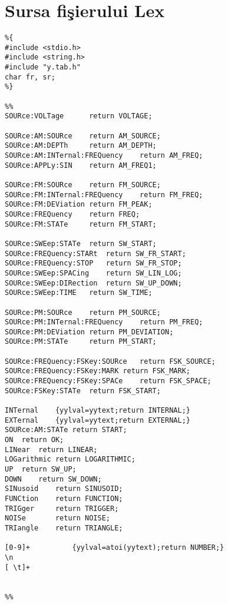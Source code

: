 
\chapter{Sursa fi\c{s}ierului Lex}
\label{AnexaA}

\begin{lstlisting}
%{
#include <stdio.h>
#include <string.h>
#include "y.tab.h"
char fr, sr;
%}

%%
SOURce:VOLTage		return VOLTAGE;

SOURce:AM:SOURce	return AM_SOURCE;
SOURce:AM:DEPTh		return AM_DEPTH;
SOURce:AM:INTernal:FREQuency	return AM_FREQ;
SOURce:APPLy:SIN	return AM_FREQ1;

SOURce:FM:SOURce	return FM_SOURCE;
SOURce:FM:INTernal:FREQuency	return FM_FREQ;
SOURce:FM:DEViation	return FM_PEAK;
SOURce:FREQuency	return FREQ;
SOURce:FM:STATe		return FM_START;

SOURce:SWEep:STATe	return SW_START;
SOURce:FREQuency:STARt	return SW_FR_START;
SOURce:FREQuency:STOP	return SW_FR_STOP;
SOURce:SWEep:SPACing	return SW_LIN_LOG;
SOURce:SWEep:DIRection	return SW_UP_DOWN;
SOURce:SWEep:TIME	return SW_TIME;

SOURce:PM:SOURce	return PM_SOURCE;
SOURce:PM:INTernal:FREQuency	return PM_FREQ;
SOURce:PM:DEViation	return PM_DEVIATION;
SOURce:PM:STATe		return PM_START;

SOURce:FREQuency:FSKey:SOURce	return FSK_SOURCE;
SOURce:FREQuency:FSKey:MARK	return FSK_MARK;
SOURce:FREQuency:FSKey:SPACe	return FSK_SPACE;
SOURce:FSKey:STATe	return FSK_START;

INTernal	{yylval=yytext;return INTERNAL;}
EXTernal	{yylval=yytext;return EXTERNAL;}
SOURce:AM:STATe	return START;
ON	return OK;
LINear	return LINEAR;
LOGarithmic	return LOGARITHMIC;
UP	return SW_UP;
DOWN	return SW_DOWN;
SINusoid	return SINUSOID;
FUNCtion	return FUNCTION;
TRIGger		return TRIGGER;
NOISe		return NOISE;
TRIangle	return TRIANGLE;

[0-9]+			{yylval=atoi(yytext);return NUMBER;}
\n
[ \t]+


%%
\end{lstlisting}
